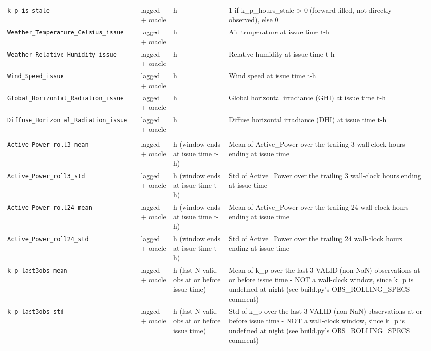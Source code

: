 \begin{table}[t]
\begin{tabular}{llll p{6.5cm}}
    \texttt{k\_p\_is\_stale} &  & lagged + oracle & h & 1 if k\_p\_hours\_stale > 0 (forward-filled, not directly observed), else 0 \\
    \texttt{Weather\_Temperature\_Celsius\_issue} &  & lagged + oracle & h & Air temperature at issue time t-h \\
    \texttt{Weather\_Relative\_Humidity\_issue} &  & lagged + oracle & h & Relative humidity at issue time t-h \\
    \texttt{Wind\_Speed\_issue} &  & lagged + oracle & h & Wind speed at issue time t-h \\
    \texttt{Global\_Horizontal\_Radiation\_issue} &  & lagged + oracle & h & Global horizontal irradiance (GHI) at issue time t-h \\
    \texttt{Diffuse\_Horizontal\_Radiation\_issue} &  & lagged + oracle & h & Diffuse horizontal irradiance (DHI) at issue time t-h \\
    \addlinespace
    \multicolumn{5}{l}{\textit{rolling statistics (9 features)}} \\
    \texttt{Active\_Power\_roll3\_mean} &  & lagged + oracle & h (window ends at issue time t-h) & Mean of Active\_Power over the trailing 3 wall-clock hours ending at issue time \\
    \texttt{Active\_Power\_roll3\_std} &  & lagged + oracle & h (window ends at issue time t-h) & Std of Active\_Power over the trailing 3 wall-clock hours ending at issue time \\
    \texttt{Active\_Power\_roll24\_mean} &  & lagged + oracle & h (window ends at issue time t-h) & Mean of Active\_Power over the trailing 24 wall-clock hours ending at issue time \\
    \texttt{Active\_Power\_roll24\_std} &  & lagged + oracle & h (window ends at issue time t-h) & Std of Active\_Power over the trailing 24 wall-clock hours ending at issue time \\
    \texttt{k\_p\_last3obs\_mean} &  & lagged + oracle & h (last N valid obs at or before issue time) & Mean of k\_p over the last 3 VALID (non-NaN) observations at or before issue time - NOT a wall-clock window, since k\_p is undefined at night (see build.py's OBS\_ROLLING\_SPECS comment) \\
    \texttt{k\_p\_last3obs\_std} &  & lagged + oracle & h (last N valid obs at or before issue time) & Std of k\_p over the last 3 VALID (non-NaN) observations at or before issue time - NOT a wall-clock window, since k\_p is undefined at night (see build.py's OBS\_ROLLING\_SPECS comment) \\

\end{tabular}
\end{table}

